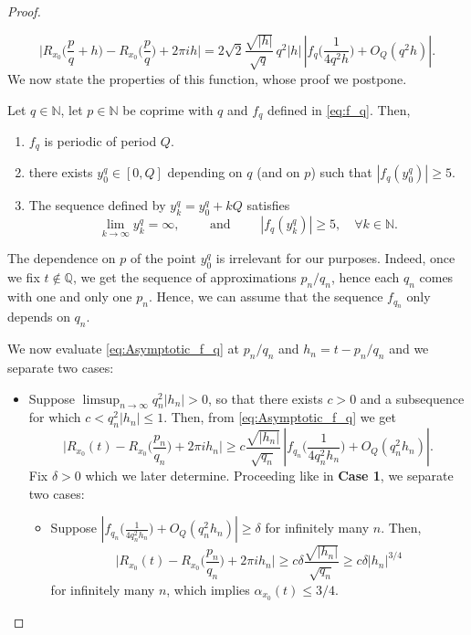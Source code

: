 \documentclass[10pt,a4paper]{amsart}
\begin{document}
\begin{proof}
\begin{itemize}
	\begin{equation}\label{eq:Asymptotic_f_q}
	\Big|  R_{x_0}\Big( \frac{p}{q} + h \Big) - R_{x_0}\Big( \frac{p}{q} \Big) + 2\pi i h  \Big|
	= 2\sqrt{2}  \frac{\sqrt{|h|}}{\sqrt{q}} \,  q^{2} |h| \,
\left|  f_q\Big( \frac{1}{4q^2 h}  \Big)  + O_Q\left( q^{2} h  \right)
\right|.
	\end{equation}
We now state the properties of this function, whose proof we postpone. 
\begin{lem}\label{thm:Lemma_f_q}
Let $q \in \mathbb N$, let $p \in \mathbb N$ be coprime with $q$ and $f_q$ defined in \eqref{eq:f_q}. 
Then, 
\begin{enumerate}
	\item $f_q$ is periodic of period $Q$.
	\item there exists $y_0^q \in [0,Q]$ depending on $q$ (and on $p$) such that $|f_q(y_0^q) | \geq 5$.
	\item The sequence defined by $y_k^q = y_0^q + kQ$ satisfies 
	\begin{equation}
	\lim_{k \to \infty} y_k^q = \infty, \qquad \text{ and } \qquad  |f_q(y_k^q)| \geq 5, \quad \forall k \in \mathbb N. 
	\end{equation}
\end{enumerate}
\end{lem}
\begin{rem}
The dependence on $p$ of the point $y_0^q$ is irrelevant for our purposes.
Indeed, once we fix $t \not\in \mathbb Q$, we get the sequence of approximations $p_n/q_n$, 
hence each $q_n$ comes with one and only one $p_n$. 
Hence, we can assume that the sequence $f_{q_n}$ only depends on $q_n$. 
\end{rem}
We now evaluate \eqref{eq:Asymptotic_f_q} at $p_n/q_n$ and $h_n = t - p_n/q_n$ and we separate two cases:
\begin{itemize}
	\item[\textbf{Case 2.1.}] Suppose $\limsup_{n \to \infty} q_n^2 |h_n| > 0$, so that there exists $c > 0$ and a subsequence for which $c < q_n^2 |h_n| \leq 1$.
	Then, from \eqref{eq:Asymptotic_f_q} we get
		\begin{equation}
	\Big|  R_{x_0}( t ) - R_{x_0}\Big( \frac{p_n}{q_n} \Big) + 2\pi i h_n  \Big|
	\geq c  \frac{\sqrt{|h_n|}}{\sqrt{q_n}} \,
\left|  f_{q_n}\Big( \frac{1}{4q_n^2 h_n}  \Big)  + O_Q\left( q_n^2 h_n  \right)
\right|.
	\end{equation}
	Fix $\delta>0$ which we later determine. Proceeding like in \textbf{Case 1}, we separate two cases:
	\begin{itemize}
		\item[\textbf{Case 2.1.1.}] Suppose $\left|  f_{q_n}\Big( \frac{1}{4q_n^2 h_n}  \Big)  + O_Q\left( q_n^2 h_n  \right) \right| \geq \delta$ for infinitely many $n$. Then, 
		\begin{equation}
	\Big|  R_{x_0}( t ) - R_{x_0}\Big( \frac{p_n}{q_n} \Big) + 2\pi i h_n  \Big|
	\geq c \delta \frac{\sqrt{|h_n|}}{\sqrt{q_n}} 
	\geq c\delta |h_n|^{3/4} 
	\end{equation}
		for infinitely many $n$, which implies $\alpha_{x_0}(t) \leq 3/4$.
				

\end{itemize}
\end{itemize}
\end{itemize}
\end{proof}
\end{document}
